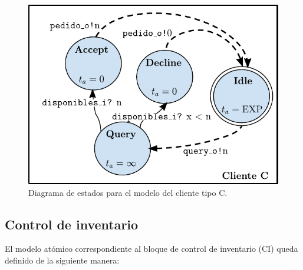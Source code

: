 \documentclass[10pt]{article}
\begin{document}
\begin{figure}[h]
	\centering
	\includegraphics{img/clienteCdevsgraph}
	\caption{Diagrama de estados para el modelo del cliente tipo C.}
	\label{fig:CTC-estados}
\end{figure}
\FloatBarrier


\subsection{Control de inventario\label{sec:CI}}
El modelo atómico correspondiente al bloque de control de inventario (CI) queda definido de la siguiente manera:
\end{document}
